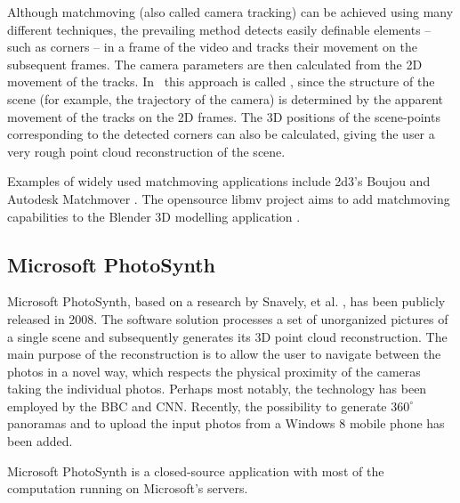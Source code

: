 Although matchmoving (also called camera tracking) can be achieved using many different techniques, the prevailing method detects easily definable elements -- such as corners -- in a frame of the video and tracks their movement on the subsequent frames. 
The camera parameters are then calculated from the 2D movement of the tracks. 
In \cv\, this approach is called , since the structure of the scene (for example, the trajectory of the camera) is determined by the apparent movement of the tracks on the 2D frames.  
The 3D positions of the scene-points corresponding to the detected corners can also be calculated, giving the user a very rough point cloud reconstruction of the scene.

Examples of widely used matchmoving applications include 2d3's Boujou  and Autodesk Matchmover .
The opensource libmv project  aims to add matchmoving capabilities to the Blender 3D modelling application . 

\subsection{Microsoft PhotoSynth} 

Microsoft PhotoSynth, based on a research by Snavely, et al. , has been publicly released in 2008. 
The software solution processes a set of unorganized pictures of a single scene and subsequently generates its 3D point cloud reconstruction. 
The main purpose of the reconstruction is to allow the user to navigate between the photos in a novel way, which respects the physical proximity of the cameras taking the individual photos. 
Perhaps most notably, the technology has been employed by the BBC and CNN. %
Recently, the possibility to generate $360^\circ$ panoramas and to upload the input photos from a Windows 8 mobile phone has been added. 

Microsoft PhotoSynth is a closed-source application with most of the computation running on Microsoft's servers. 


